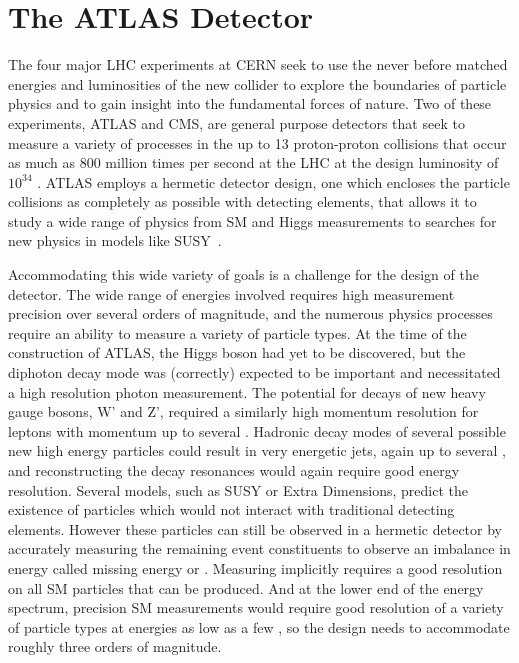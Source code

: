 \chapter{The ATLAS Detector}

\label{ch:atlas}

The four major \ac{LHC} experiments at \ac{CERN} seek to use the never before matched energies and luminosities of the new collider to explore the boundaries of particle physics and to gain insight into the fundamental forces of nature.
Two of these experiments, \ac{ATLAS} and \ac{CMS}, are general purpose detectors that seek to measure a variety of processes in the up to 13 \TeV proton-proton collisions that occur as much as 800 million times per second at the \ac{LHC} at the design luminosity of $10^{34}$ \lcms. 
\ac{ATLAS} employs a hermetic detector design, one which encloses the particle collisions as completely as possible with detecting elements, that allows it to study a wide range of physics from \ac{SM} and Higgs measurements to searches for new physics in models like \ac{SUSY}~\cite{atlas_experiment}.

Accommodating this wide variety of goals is a challenge for the design of the detector.
The wide range of energies involved requires high measurement precision over several orders of magnitude, and the numerous physics processes require an ability to measure a variety of particle types.
At the time of the construction of \ac{ATLAS}, the Higgs boson had yet to be discovered, but the diphoton decay mode was (correctly) expected to be important and necessitated a high resolution photon measurement.
The potential for decays of new heavy gauge bosons, W' and Z', required a similarly high momentum resolution for leptons with momentum up to several \TeV.
Hadronic decay modes of several possible new high energy particles could result in very energetic jets, again up to several \TeV, and reconstructing the decay resonances would again require good energy resolution.
Several models, such as \ac{SUSY} or Extra Dimensions, predict the existence of particles which would not interact with traditional detecting elements. 
However these particles can still be observed in a hermetic detector by accurately measuring the remaining event constituents to observe an imbalance in energy called missing energy or \met. 
Measuring \met implicitly requires a good resolution on all \ac{SM} particles that can be produced.
And at the lower end of the energy spectrum, precision \ac{SM} measurements would require good resolution of a variety of particle types at energies as low as a few \GeV, so the design needs to accommodate roughly three orders of magnitude.


